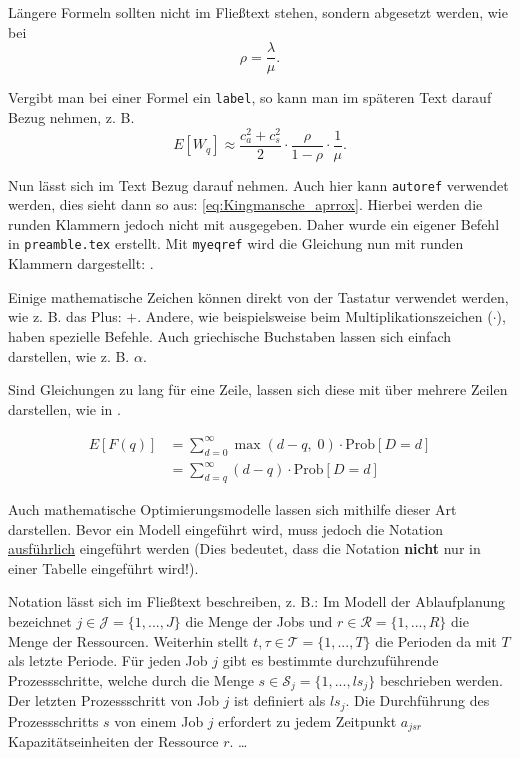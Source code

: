Längere Formeln sollten nicht im Fließtext stehen, sondern abgesetzt werden, wie bei
\begin{equation} 
    \rho=\frac{\lambda}{\mu}.
\end{equation}

Vergibt man bei einer Formel ein \texttt{label}, so kann man im späteren Text darauf Bezug nehmen, z. B.
\begin{equation}
   E[W_q] \approx \frac{c_a^2+c_s^2}{2} \cdot \frac{\rho}{1-\rho}\cdot \frac{1}{\mu}.\label{eq:Kingmansche_aprrox}
\end{equation}

Nun lässt sich im Text Bezug darauf nehmen. Auch hier kann \texttt{autoref} verwendet werden, dies sieht dann so aus: \autoref{eq:Kingmansche_aprrox}. Hierbei werden die runden Klammern jedoch nicht mit ausgegeben. Daher wurde ein eigener Befehl in \texttt{preamble.tex} erstellt. Mit \texttt{myeqref} wird die Gleichung nun mit runden Klammern dargestellt: .

Einige mathematische Zeichen können direkt von der Tastatur verwendet werden, wie z. B. das Plus: $+$. Andere, wie beispielsweise beim Multiplikationszeichen ($\cdot$), haben spezielle Befehle. Auch griechische Buchstaben lassen sich einfach darstellen, wie z. B. $\alpha$.

Sind Gleichungen zu lang für eine Zeile, lassen sich diese mit über mehrere Zeilen darstellen, wie in .

\begin{equation}
\begin{aligned}
    E[F(q)] &= \sum_{d=0}^{\infty} \max(d-q,\; 0) \cdot \text{Prob}[D=d] \\
    & = \sum_{d=q}^{\infty} (d-q) \cdot \text{Prob}[D=d]
    \label{eq:Erwartungswert_Fehlmenge}
\end{aligned}
\end{equation}


Auch mathematische Optimierungsmodelle lassen sich mithilfe dieser Art darstellen. Bevor ein Modell eingeführt wird, muss jedoch die Notation \underline{ausführlich} eingeführt werden (Dies bedeutet, dass die Notation \textbf{nicht} nur in einer Tabelle eingeführt wird!). 

Notation lässt sich im Fließtext beschreiben, z. B.:  Im Modell der Ablaufplanung bezeichnet $j \in \mathcal{J} = \{1, ..., J\}$ die Menge der Jobs und $r \in \mathcal{R} = \{1, ..., R\} $ die Menge der Ressourcen. Weiterhin stellt $t,\tau \in \mathcal{T} = \{1, ..., T\}$ die Perioden da mit $T$ als letzte Periode. Für jeden Job $j$ gibt es bestimmte durchzuführende Prozessschritte, welche durch die Menge $s \in \mathcal{S}_j = \{1, ..., ls_j\}$ beschrieben werden. Der letzten Prozessschritt von Job $j$ ist definiert als $ls_j$. Die Durchführung des Prozessschritts $s$ von einem Job $j$ erfordert zu jedem Zeitpunkt $a_{jsr}$ Kapazitätseinheiten der Ressource $r$. \dots

